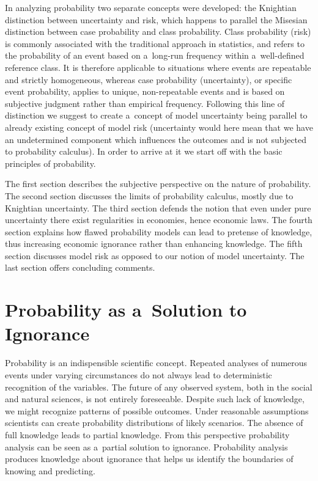 In analyzing probability two separate concepts were developed: the Knightian distinction between uncertainty and risk, which happens to parallel the Misesian distinction between case probability and class probability. Class probability (risk) is commonly associated with the traditional approach in statistics, and refers to the probability of an event based on a~long-run frequency within a~well-defined reference class. It is therefore applicable to situations where events are repeatable and strictly homogeneous, whereas case probability (uncertainty), or specific event probability, applies to unique, non-repeatable events and is based on subjective judgment rather than empirical frequency. Following this line of distinction we suggest to create a~concept of model uncertainty being parallel to already existing concept of model risk (uncertainty would here mean that we have an undetermined component which influences the outcomes and is not subjected to probability calculus). In order to arrive at it we start off with the basic principles of probability.



The first section describes the subjective perspective on the nature of probability. The second section discusses the limits of probability calculus, mostly due to Knightian uncertainty. The third section defends the notion that even under pure uncertainty there exist regularities in economies, hence economic laws. The fourth section explains how flawed probability models can lead to pretense of knowledge, thus increasing economic ignorance rather than enhancing knowledge. The fifth section discusses model risk as opposed to our notion of model uncertainty. The last section offers concluding comments.



\section{Probability as a~Solution to Ignorance}

Probability is an indispensible scientific concept. Repeated analyses of numerous events under varying circumstances do not always lead to deterministic recognition of the variables. The future of any observed system, both in the social and natural sciences, is not entirely foreseeable. Despite such lack of knowledge, we might recognize patterns of possible outcomes. Under reasonable assumptions scientists can create probability distributions of likely scenarios. The absence of full knowledge leads to partial knowledge. From this perspective probability analysis can be seen as a~partial solution to ignorance. Probability analysis produces knowledge about ignorance that helps us identify the boundaries of knowing and predicting.



